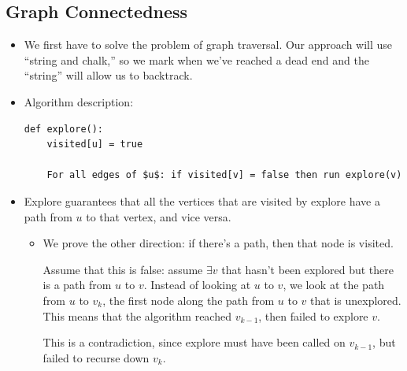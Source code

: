 \documentclass[10pt]{article}
\begin{document}
	\subsection{Graph Connectedness}
	\begin{itemize}
		\item We first have to solve the problem of graph traversal. Our approach will use ``string and chalk,''
			so we mark when we've reached a dead end and the ``string'' will allow us to backtrack. 
		\item Algorithm description:

\begin{lstlisting}[style=tt]
def explore():
	visited[u] = true

	For all edges of $u$: if visited[v] = false then run explore(v)
\end{lstlisting}
		\item Explore guarantees that all the vertices that are visited by explore have a path from $u$ to 
			that vertex, and vice versa.
			\begin{itemize}
				\item We prove the other direction: if there's a path, then that node is visited.

					Assume that this is false: assume $\exists v$ that hasn't been explored but there is 
					a path from $u$ to $v$. Instead of looking at $u$ to $v$, we look at the path 
					from $u$ to $v_k$, the first node along the path from $u$ to $v$ that is unexplored. 
					This means that the algorithm reached $v_{k - 1}$, then failed to explore $v$.

					This is a contradiction, since explore must have been called on $v_{k-1}$, but failed to 
					recurse down $v_k$. 
			\end{itemize}
	\end{itemize}
\end{document}
